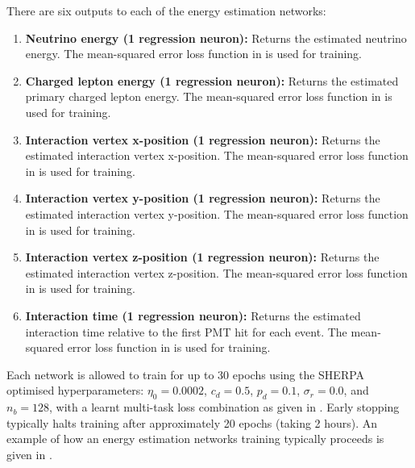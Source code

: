 There are six outputs to each of the energy estimation networks:
\begin{enumerate}
    \item \textbf{Neutrino energy (1 regression neuron):} Returns the estimated neutrino energy.
          The mean-squared error loss function in  is used for training.
    \item \textbf{Charged lepton energy (1 regression neuron):} Returns the estimated primary
          charged lepton energy. The mean-squared error loss function in  is
          used for training.
    \item \textbf{Interaction vertex x-position (1 regression neuron):} Returns the estimated
          interaction vertex x-position. The mean-squared error loss function in
           is used for training.
    \item \textbf{Interaction vertex y-position (1 regression neuron):} Returns the estimated
          interaction vertex y-position. The mean-squared error loss function in
           is used for training.
    \item \textbf{Interaction vertex z-position (1 regression neuron):} Returns the estimated
          interaction vertex z-position. The mean-squared error loss function in
           is used for training.
    \item \textbf{Interaction time (1 regression neuron):} Returns the estimated interaction time
          relative to the first PMT hit for each event. The mean-squared error loss function in
           is used for training.
\end{enumerate}

Each network is allowed to train for up to 30 epochs using the SHERPA optimised hyperparameters:
$\eta_{0}=0.0002$, $c_{d}=0.5$, $p_{d}=0.1$, $\sigma_{r}=0.0$, and $n_{b}=128$, with a learnt
multi-task loss combination as given in . Early stopping typically
halts training after approximately 20 epochs (taking 2 hours). An example of how an energy
estimation networks training typically proceeds is given in .

